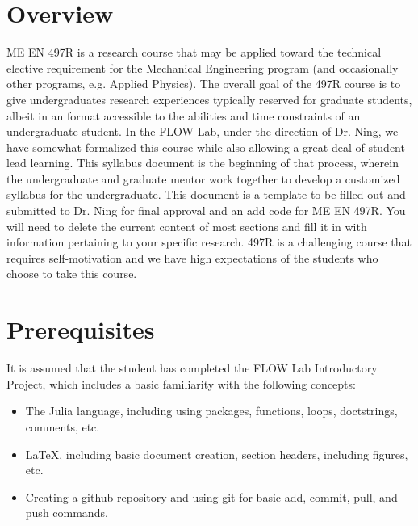 \documentclass[12pt]{article}
\begin{document}
\section{Overview}
\label{sec:overview}

ME EN 497R is a research course that may be applied toward the technical elective requirement for the Mechanical Engineering program (and occasionally other programs, e.g. Applied Physics).
The overall goal of the 497R course is to give undergraduates research experiences typically reserved for graduate students, albeit in an format accessible to the abilities and time constraints of an undergraduate student.
In the FLOW Lab, under the direction of Dr. Ning, we have somewhat formalized this course while also allowing a great deal of student-lead learning.
This syllabus document is the beginning of that process, wherein the undergraduate and graduate mentor work together to develop a customized syllabus for the undergraduate.
This document is a template to be filled out and submitted to Dr. Ning for final approval and an add code for ME EN 497R.
You will need to delete the current content of most sections and fill it in with information pertaining to your specific research.
497R is a challenging course that requires self-motivation and we have high expectations of the students who choose to take this course. 





\section{Prerequisites}
\label{sec:prerequisites}

It is assumed that the student has completed the FLOW Lab Introductory Project, which includes a basic familiarity with the following concepts:

\begin{itemize}
	\item The Julia language, including using packages, functions, loops, doctstrings, comments, etc.
	\item LaTeX, including basic document creation, section headers, including figures, etc.
	\item Creating a github repository and using git for basic add, commit, pull, and push commands.	
\end{itemize}
\end{document}
